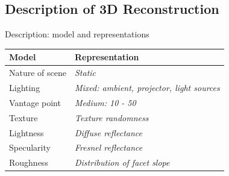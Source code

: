 \documentclass[10pt]{beamer}
\begin{document}
\subsection{Description of 3D Reconstruction}
\begin{frame}{Description: model and representations}

\begin{table}
  \centering
  \begin{tabular}{l|l}
  \toprule
  \textbf{Model} & \textbf{Representation}\\
  \midrule
  Nature of scene & \textit{Static} \\
  Lighting & \textit{Mixed: ambient, projector, light sources} \\
  Vantage point & \textit{Medium: 10 - 50} \\
  Texture & \textit{Texture randomness}\\
  Lightness & \textit{Diffuse reflectance}\\
  Specularity & \textit{Fresnel reflectance}\\
  Roughness & \textit{Distribution of facet slope}\\
  \bottomrule
  \end{tabular}
\end{table}

\end{frame}
\end{document}
